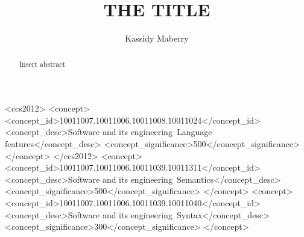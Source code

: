 \documentclass[sigconf, nonacm, authorversion, language=english, 12pt]{acmart}
\begin{document}
\title{THE TITLE}


\author{Kassidy Maberry}



\newcommand{\PLtitle}{\setlength{\parindent}{0pt}
  \twocolumn[{%
        \begin{center}
          \huge\textbf{THE TITLE}\\
          \normalsize Subtitle\\

          \begin{singlespace}


            Name: Kassidy Maberry\\
            Department of Computer Science and Engineering\\
            New Mexico Institue of Mining and Technology\\
            Socorro, New Mexico, USA\\
            kassidy.maberry@student.nmt.edu\\
            \bigskip
            \bigskip
          \end{singlespace}
        \end{center}
      }]
}

\begin{abstract}
  Insert abstract
\end{abstract}


\begin{CCSXML}
  <ccs2012>
  <concept>
  <concept_id>10011007.10011006.10011008.10011024</concept_id>
  <concept_desc>Software and its engineering~Language features</concept_desc>
  <concept_significance>500</concept_significance>
  </concept>
  </ccs2012>
  <concept>
  <concept_id>10011007.10011006.10011039.10011311</concept_id>
  <concept_desc>Software and its engineering~Semantics</concept_desc>
  <concept_significance>500</concept_significance>
  </concept>
  <concept>
  <concept_id>10011007.10011006.10011039.10011040</concept_id>
  <concept_desc>Software and its engineering~Syntax</concept_desc>
  <concept_significance>300</concept_significance>
  </concept>
\end{CCSXML}
\end{document}
